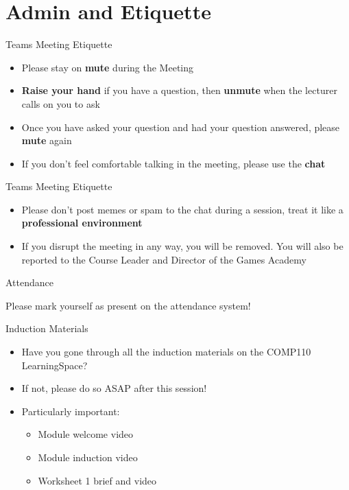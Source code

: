 \part{Admin and Etiquette}
\frame{\partpage}

\begin{frame}{Teams Meeting Etiquette}
    \begin{itemize}
        \pause\item Please stay on \textbf{mute} during the Meeting
        \pause\item \textbf{Raise your hand} if you have a question, then \textbf{unmute} when the lecturer calls on you to ask
        \pause\item Once you have asked your question and had your question answered, please \textbf{mute} again
        \pause\item If you don't feel comfortable talking in the meeting, please use the \textbf{chat}
    \end{itemize}
\end{frame}

\begin{frame}{Teams Meeting Etiquette}
    \begin{itemize}
        \pause\item Please don't post memes or spam to the chat during a session, treat it like a \textbf{professional environment}
        \pause\item If you disrupt the meeting in any way, you will be removed. You will also be reported to the Course Leader and Director of the Games Academy
    \end{itemize}
\end{frame}

\begin{frame}{Attendance}
    \begin{center}
        Please mark yourself as present on the attendance system!
    \end{center}
\end{frame}

\begin{frame}{Induction Materials}
    \begin{itemize}
        \pause\item Have you gone through all the induction materials on the COMP110 LearningSpace?
        \pause\item If not, please do so ASAP after this session!
        \pause\item Particularly important:
        \begin{itemize}
            \pause\item Module welcome video
            \pause\item Module induction video
            \pause\item Worksheet 1 brief and video
        \end{itemize}
    \end{itemize}
\end{frame}

